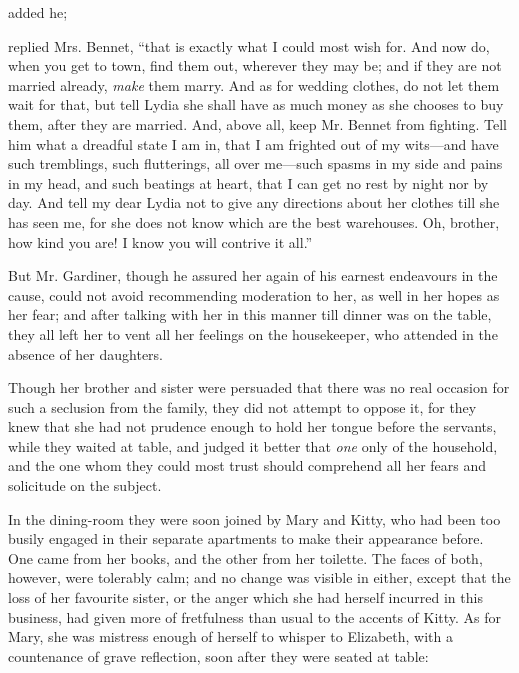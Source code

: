  added he; 

 replied Mrs. Bennet, “that is exactly what I could most wish for. And now do, when you get to town, find them out, wherever they may be; and if they are not married already, {\em make} them marry. And as for wedding clothes, do not let them wait for that, but tell Lydia she shall have as much money as she chooses to buy them, after they are married. And, above all, keep Mr. Bennet from fighting. Tell him what a dreadful state I am in, that I am frighted out of my wits---and have such tremblings, such flutterings, all over me---such spasms in my side and pains in my head, and such beatings at heart, that I can get no rest by night nor by day. And tell my dear Lydia not to give any directions about her clothes till she has seen me, for she does not know which are the best warehouses. Oh, brother, how kind you are! I know you will contrive it all.”

But Mr. Gardiner, though he assured her again of his earnest endeavours in the cause, could not avoid recommending moderation to her, as well in her hopes as her fear; and after talking with her in this manner till dinner was on the table, they all left her to vent all her feelings on the housekeeper, who attended in the absence of her daughters.

Though her brother and sister were persuaded that there was no real occasion for such a seclusion from the family, they did not attempt to oppose it, for they knew that she had not prudence enough to hold her tongue before the servants, while they waited at table, and judged it better that {\em one} only of the household, and the one whom they could most trust should comprehend all her fears and solicitude on the subject.

In the dining-room they were soon joined by Mary and Kitty, who had been too busily engaged in their separate apartments to make their appearance before. One came from her books, and the other from her toilette. The faces of both, however, were tolerably calm; and no change was visible in either, except that the loss of her favourite sister, or the anger which she had herself incurred in this business, had given more of fretfulness than usual to the accents of Kitty. As for Mary, she was mistress enough of herself to whisper to Elizabeth, with a countenance of grave reflection, soon after they were seated at table:


